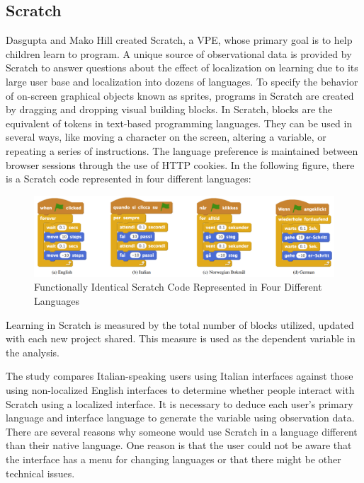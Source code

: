 \subsection{Scratch}
 Dasgupta and Mako Hill \cite{dasgupta2017learning} created Scratch, a \ac{VPE}, whose primary goal is to help children learn to program. A unique source of observational data is provided by Scratch to answer questions about the effect of localization on learning due to its large user base and localization into dozens of languages. To specify the behavior of on-screen graphical objects known as sprites, programs in Scratch are created by dragging and dropping visual building blocks. In Scratch, blocks are the equivalent of tokens in text-based programming languages. They can be used in several ways, like moving a character on the screen, altering a variable, or repeating a series of instructions. The language preference is maintained between browser sessions through the use of \ac{HTTP} cookies. In the following figure, there is a Scratch code represented in four different languages:

\begin{figure}[ht]
\centering
\includegraphics[width=15cm]{ch2-images/scratch.png}
\caption{Functionally Identical Scratch Code Represented in Four Different Languages \cite{dasgupta2017learning}}
\label{fig:Functionally Identical Scratch Code Represented in Four Different Languages}
\end{figure} 

Learning in Scratch is measured by the total number of blocks utilized, updated with each new project shared. This measure is used as the dependent variable in the analysis.

The study compares Italian-speaking users using Italian interfaces against those using non-localized English interfaces to determine whether people interact with Scratch using a localized interface. It is necessary to deduce each user's primary language and interface language to generate the variable using observation data. There are several reasons why someone would use Scratch in a language different than their native language. One reason is that the user could not be aware that the interface has a menu for changing languages or that there might be other technical issues.

